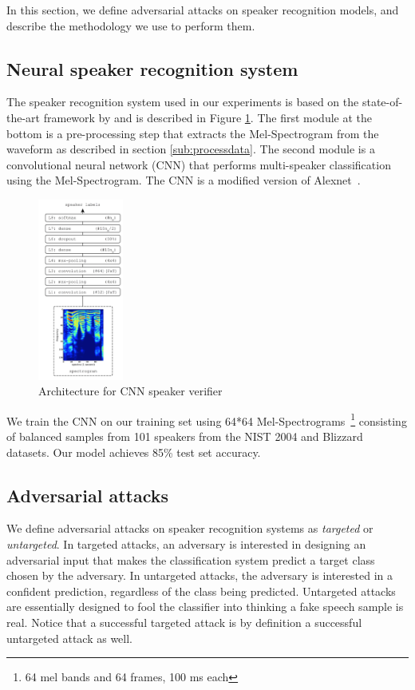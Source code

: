 In this section, we define adversarial attacks on speaker recognition models, and describe the methodology we use to perform them.

\subsection{Neural speaker recognition system}
\label{sub:speaker_recognition}
The speaker recognition system used in our experiments is based on the state-of-the-art framework by \cite{lukic2016speaker} and is described in Figure \ref{fig:CNN}. The first module at the bottom is a pre-processing step that extracts the Mel-Spectrogram from the waveform as described in section \ref{sub:processdata}. The second module is a convolutional neural network (CNN) that performs multi-speaker classification using the Mel-Spectrogram. The CNN is a modified version of Alexnet~\cite{krizhevsky2012imagenet}.

\begin{figure}[h]
    \centering
    \includegraphics[width=0.25\textwidth]{./fig/cnn.png}
    \caption{Architecture for CNN speaker verifier}
    \label{fig:CNN}
\end{figure}

We train the CNN on our training set using 64*64 Mel-Spectrograms~\footnote{64 mel bands and 64 frames, 100 ms each} consisting of balanced samples from 101 speakers from the NIST 2004 and Blizzard datasets. Our model achieves 85\% test set accuracy.

\subsection{Adversarial attacks}
We define adversarial attacks on speaker recognition systems as \textit{targeted} or \textit{untargeted}. In
targeted attacks, an adversary is interested in designing an adversarial input
that makes the classification system predict a target class chosen by the
adversary. In untargeted attacks, the adversary is interested in a confident
prediction, regardless of the class being predicted. Untargeted attacks are essentially designed to fool the classifier into thinking a fake speech sample is real. Notice that a successful targeted attack is by definition a successful untargeted attack as well.